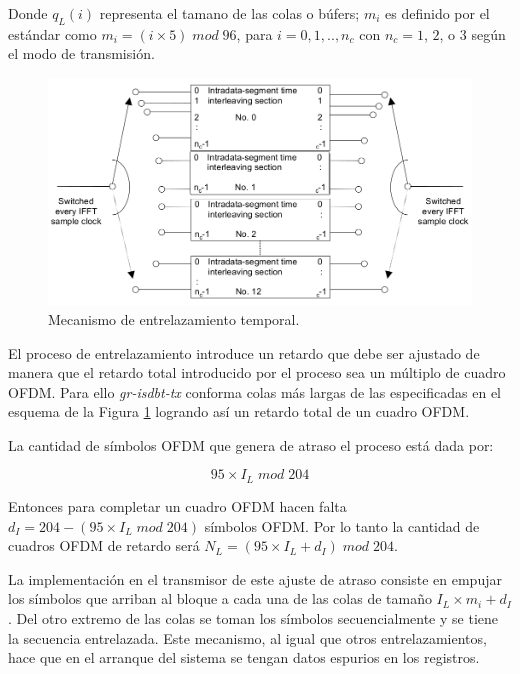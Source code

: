 Donde $q_L(i)$ representa el tamano de las colas o búfers; $m_i$ es definido por el est\'andar como $m_i = (i \times 5) \; mod \; 96$, para $i = 0, 1,..,n_c$ con $n_c = 1$, $2$, o $3$ seg\'un el modo de transmisi\'on. 

\begin{figure}[!h]
	\centering
	\includegraphics[scale=0.4]{figuras/cap05/entrelazamiento_temporal}
	\caption{\label{f:entrelazamiento_temporal} Mecanismo de entrelazamiento temporal.}
\end{figure}

El proceso de entrelazamiento introduce un retardo que debe ser ajustado de manera que el retardo total introducido por el proceso sea un m\'ultiplo de cuadro OFDM. Para ello \textit{gr-isdbt-tx} conforma colas m\'as largas de las especificadas en el esquema de la Figura \ref{f:entrelazamiento_temporal} logrando as\'i un retardo total de un cuadro OFDM.

La cantidad de s\'imbolos OFDM que genera de atraso el proceso est\'a dada por:

\begin{equation}
95 \times I_L \; mod \; 204
\end{equation}

Entonces para completar un cuadro OFDM hacen falta $d_I = 204 - (95 \times I_L \; mod \; 204)$ s\'imbolos OFDM. Por lo tanto la cantidad de cuadros OFDM de retardo ser\'a $N_L = (95 \times I_L +d_I) \; mod \; 204$.

La implementaci\'on en el transmisor de este ajuste de atraso consiste en empujar los s\'imbolos que arriban al bloque a cada una de las colas de tamaño $I_L \times m_i + d_I$. Del otro extremo de las colas se toman los s\'imbolos secuencialmente y se tiene la secuencia entrelazada. Este mecanismo, al igual que otros entrelazamientos, hace que en el arranque del sistema se tengan datos espurios en los registros. 

